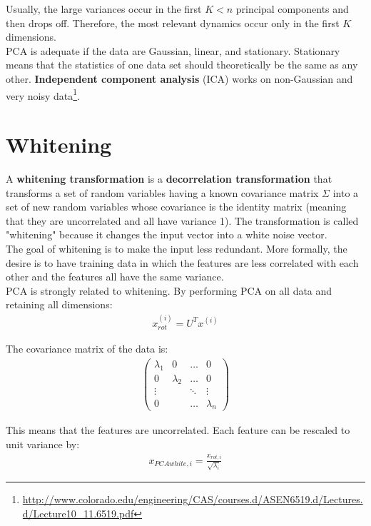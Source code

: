 \documentclass{report}
\begin{document}
Usually, the large variances occur in the first $K<n$ principal components and then drops off. Therefore, the most relevant dynamics occur only in the first $K$ dimensions.
\\

PCA is adequate if the data are Gaussian, linear, and stationary.
Stationary means that the statistics of one data set should theoretically be the same as any other.
{\bf Independent component analysis} (ICA) works on non-Gaussian and very noisy data\footnote{\url{http://www.colorado.edu/engineering/CAS/courses.d/ASEN6519.d/Lectures.d/Lecture10_11.6519.pdf}}.

\section{Whitening}
\label{chapter:whitening}
A {\bf whitening transformation} is a {\bf decorrelation transformation} that transforms a set of random variables having a known covariance matrix $\Sigma$ into a set of new random variables whose covariance is the identity matrix (meaning that they are uncorrelated and all have variance 1).
The transformation is called "whitening" because it changes the input vector into a white noise vector. 
\\
The goal of whitening is to make the input less redundant. More formally, the desire is to have training data in which the features are less correlated with each other and the features all have the same variance.
\\
PCA is strongly related to whitening. By performing PCA on all data and retaining all dimensions:
\begin{align*}
x_{rot}^{(i)} = U^Tx^{(i)}
\end{align*}

The covariance matrix of the data is:
\begin{align*}
\begin{pmatrix}
\lambda_1 & 0 & \dots & 0 \\
0 & \lambda_2 & \dots & 0 \\
\vdots & & \ddots & \vdots \\
0 & & \dots & \lambda_n
\end{pmatrix}
\end{align*}

This means that the features are uncorrelated. Each feature can be rescaled to unit variance by:
\begin{align*}
x_{PCAwhite,i} = \frac{x_{rot,i}}{\sqrt{\lambda_i}}
\end{align*}
\end{document}
